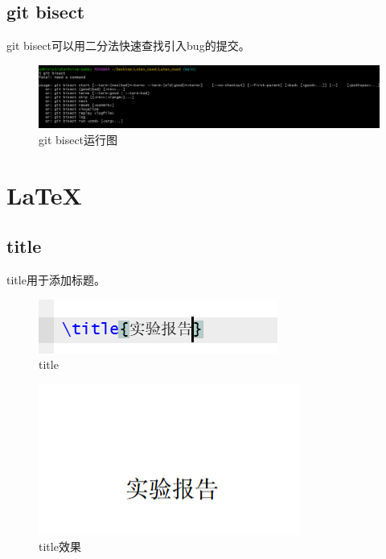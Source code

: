 \documentclass{article}
\begin{document}
\subsection{git bisect}
git bisect可以用二分法快速查找引入bug的提交。
\begin{figure}[H]
    \centering
    \includegraphics[width=1\linewidth]{git_bisect.png}
    \caption{git bisect运行图}
    \label{fig:bisect}
\end{figure}



\section{LaTeX}
\subsection{title}
title用于添加标题。
\begin{figure}[H]
    \centering
    \includegraphics[width=1\linewidth]{添加标题.png}
    \caption{title}
\end{figure}
\begin{figure}[H]
    \centering
    \includegraphics[width=1\linewidth]{添加标题效果.png}
    \caption{title效果}
\end{figure}
\end{document}
